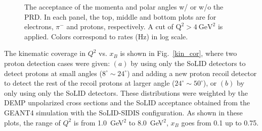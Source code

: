 \begin{figure}[!ht]
 \begin{center}
   \caption[The acceptance of the momenta and scattering angles for electrons,
     $\pi^{-}$ and protons]{\footnotesize{The acceptance of the momenta and
       polar angles w/ or w/o the PRD. In each panel, the top, middle and
       bottom plots are for electrons, $\pi^{-}$ and protons, respectively. A
       cut of $\mathrm{Q^{2}>4~GeV^{2}}$ is applied. Colors correspond to rates
       (Hz) in log scale.}}
  \label{p_theta}
  \end{center}
\end{figure}

The kinematic coverage in $Q^{2}$ vs. $x_{B}$ is shown in Fig.~\ref{kin_cor},
where two proton detection cases were given: $(a)$ by using only the SoLID
detectors to detect protons at small angles ($8^{\circ}\sim24^{\circ}$) and
adding a new proton recoil detector to detect the rest of the recoil protons at
larger angle ($24^{\circ}\sim50^{\circ}$), or $(b)$ by only using only the 
SoLID detectors. These distributions were weighted by the DEMP unpolarized
cross sections and the SoLID acceptance obtained from the GEANT4 simulation
with the SoLID-SIDIS configuration. As shown in these plots, the range of
$Q^{2}$ is from 1.0~GeV$^{2}$ to 8.0~GeV$^{2}$, $x_{B}$ goes from 0.1 up to
0.75.

